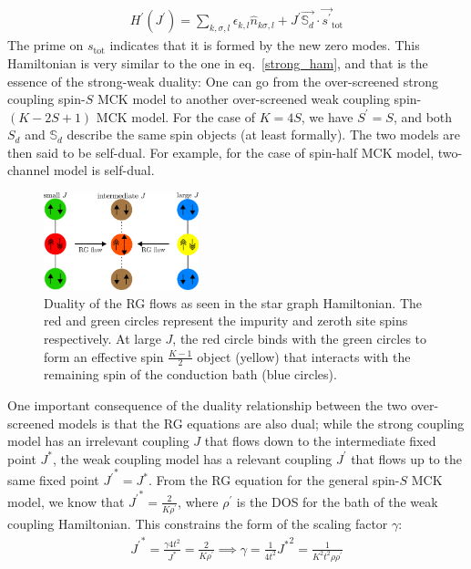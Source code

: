 \documentclass[reprint,prb,superscriptaddress]{revtex4-2}
\begin{document}
\begin{equation}\begin{aligned}
	H^\prime(J^\prime) = \sum_{k,\sigma,l}\epsilon_{k,l} \hat n_{k\sigma,l} + J^\prime \vec{\mathbb{S}_d}\cdot\vec{s^\prime}_\text{tot}
\end{aligned}\end{equation}
The prime on \(s_\text{tot}\) indicates that it is formed by the new zero modes. This Hamiltonian is very similar to the one in eq.~\ref{strong_ham}, and that is the essence of the strong-weak duality: One can go from the over-screened strong coupling spin-\(S\) MCK model to another over-screened weak coupling spin-\((K-2S+1)\) MCK model. For the case of \(K=4S\), we have \(S^\prime = S\), and both \(S_d\) and \(\mathbb{S}_d\) describe the same spin objects (at least formally). The two models are then said to be self-dual. For example, for the case of spin-half MCK model, two-channel model is self-dual.
\begin{figure}[!htpb]
	\centering
	\includegraphics[width=0.4\textwidth]{./duality.pdf}
	\caption{Duality of the RG flows as seen in the star graph Hamiltonian. The red and green circles represent the impurity and zeroth site spins respectively. At large \(J\), the red circle binds with the green circles to form an effective spin \(\frac{K-1}{2}\) object (yellow) that interacts with the remaining spin of the conduction bath (blue circles).}
	\label{duality_fig}
\end{figure}

One important consequence of the duality relationship between the two over-screened models is that the RG equations are also dual; while the strong coupling model has an irrelevant coupling \(J\) that flows down to the intermediate fixed point \(J^*\), the weak coupling model has a relevant coupling \(J^\prime\) that flows up to the same fixed point \({J^\prime}^* = J^*\). From the RG equation for the general spin-\(S\) MCK model, we know that \({J^\prime}^* = \frac{2}{K \rho^\prime}\), where \(\rho^\prime\) is the DOS for the bath of the weak coupling Hamiltonian. This constrains the form of the scaling factor \(\gamma\):
\begin{equation}\begin{aligned}
	{J^\prime}^* = \frac{\gamma 4t^2}{J^*} = \frac{2}{K \rho^\prime} \implies \gamma = \frac{1}{4t^2} {J^*}^2 = \frac{1}{K^2 t^2 \rho \rho^\prime}
\end{aligned}\end{equation}
\end{document}
